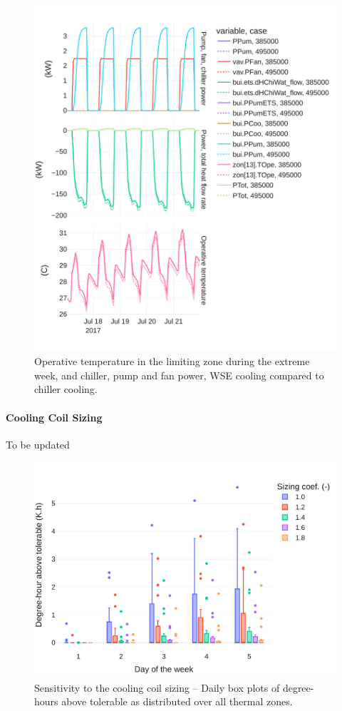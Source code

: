 \begin{figure}[!htbp]
    \centering
    \includegraphics[width=.7\linewidth]{../python_scripts/figures/TOpe.pdf}
    \caption{Operative temperature in the limiting zone during the extreme week, and chiller, pump and fan power, WSE cooling compared to chiller cooling.}
    \label{fig:tope}
\end{figure}


\paragraph{Cooling Coil Sizing} \label{par:cooling_coil}

To be updated


\begin{figure}[!htbp]
\centering
\includegraphics[width=.7\linewidth]{../python_scripts/figures/CoilSizing.pdf}
\caption{Sensitivity to the cooling coil sizing -- Daily box plots of degree-hours above tolerable as distributed over all thermal zones.}
\label{fig:coil}
\end{figure}

